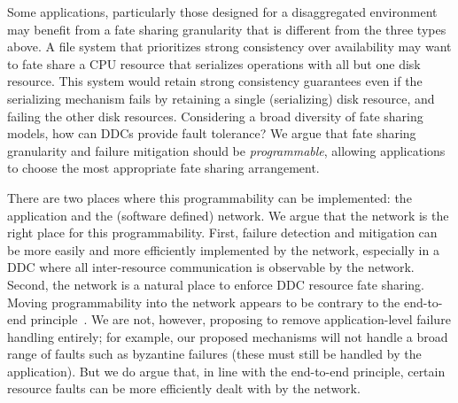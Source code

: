 Some applications, particularly those designed for a disaggregated
environment may benefit from a fate sharing granularity that is
different from the three types above. %
A file system that prioritizes strong consistency over
availability may want to fate share a CPU resource that serializes
operations with all but one disk resource. This system would retain
strong consistency guarantees even if the serializing mechanism fails
by retaining a single (serializing) disk resource, and failing the
other disk resources.
%
%
Considering a broad diversity of fate sharing models, how can DDCs
provide fault tolerance? We argue that fate sharing granularity and failure mitigation should
be \emph{programmable}, allowing applications to choose the most
appropriate fate sharing arrangement. 

There are two places where this programmability can be implemented:
the application and the (software defined) network. We argue that the
network is the right place for this programmability. First, failure
detection and mitigation can be more easily and more efficiently
implemented by the network, especially in a DDC where all
inter-resource communication is observable by the network. Second, the
network is a natural place to enforce DDC resource fate sharing.
%
Moving programmability into the network appears to be contrary to the
end-to-end principle~\cite{Saltzer1984}. We are not, however,
proposing to remove application-level failure handling entirely; for
example, our proposed mechanisms will not handle a broad range of
faults such as byzantine failures (these must still be handled by the
application). But we do argue that, in line with the end-to-end
principle, certain resource faults can be more efficiently dealt with
by the network.


%
%




